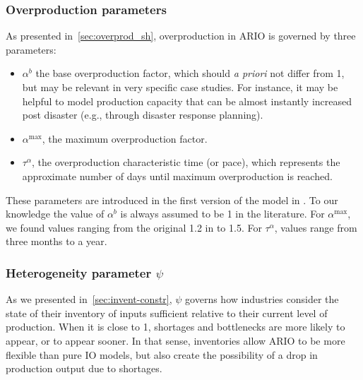 
\subsubsection{Overproduction parameters}
\label{sec:overprod-params}

As presented in~\cref{sec:overprod_sh}, overproduction in ARIO is
governed by three parameters:
\begin{itemize}
\item $\alpha^{b}$ the base overproduction factor, which should \emph{a priori}
  not differ from 1, but may be relevant in very specific case studies. For
  instance, it may be helpful to model production capacity that can be almost
  instantly increased post disaster (e.g., through disaster response planning).
\item $\alpha^{\textrm{max}}$, the maximum overproduction factor.
\item $\tau^{\alpha}$, the overproduction characteristic time (or pace), which
  represents the approximate number of days until maximum overproduction is
  reached.
\end{itemize}

These parameters are introduced in the first version of the model in
\textcite{hallegatte-2008-adapt-region}. To our knowledge the value
of $\alpha^{b}$ is always assumed to be 1 in the literature. For
$\alpha^{\textrm{max}}$, we found values ranging from the original 1.2 in
\textcite{hallegatte-2008-adapt-region} to 1.5. For $\tau^{\alpha}$,
values range from three months to a year.

\subsubsection{Heterogeneity parameter $\psi$}
\label{sec:parameter-psi}

As we presented in~\cref{sec:invent-constr}, $\psi$ governs how
industries consider the state of their inventory of inputs sufficient relative
to their current level of production. When it is close to 1, shortages and
bottlenecks are more likely to appear, or to appear sooner. In that sense,
inventories allow ARIO to be more flexible than pure IO models, but also create
the possibility of a drop in production output due to shortages.


